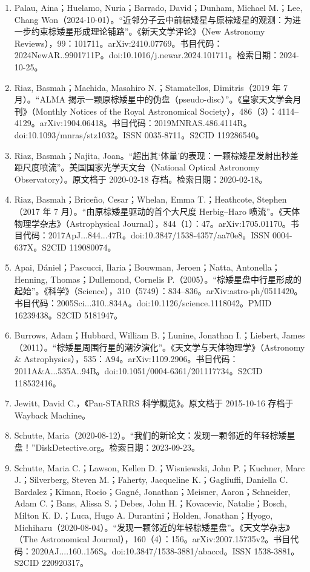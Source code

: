 \begin{enumerate}
\item Palau, Aina；Huelamo, Nuria；Barrado, David；Dunham, Michael M.；Lee, Chang Won（2024-10-01）。“近邻分子云中前棕矮星与原棕矮星的观测：为进一步约束棕矮星形成理论铺路”。《新天文学评论》（New Astronomy Reviews），99：101711。arXiv:2410.07769。书目代码：2024NewAR..9901711P。doi:10.1016/j.newar.2024.101711。检索日期：2024-10-25。
\item Riaz, Basmah；Machida, Masahiro N.；Stamatellos, Dimitris（2019 年 7 月）。“ALMA 揭示一颗原棕矮星中的伪盘（pseudo-disc）”。《皇家天文学会月刊》（Monthly Notices of the Royal Astronomical Society），486（3）：4114–4129。arXiv:1904.06418。书目代码：2019MNRAS.486.4114R。doi:10.1093/mnras/stz1032。ISSN 0035-8711。S2CID 119286540。
\item Riaz, Basmah；Najita, Joan。“超出其‘体量’的表现：一颗棕矮星发射出秒差距尺度喷流”。美国国家光学天文台（National Optical Astronomy Observatory）。原文档于 2020-02-18 存档。检索日期：2020-02-18。
\item Riaz, Basmah；Briceño, Cesar；Whelan, Emma T.；Heathcote, Stephen（2017 年 7 月）。“由原棕矮星驱动的首个大尺度 Herbig–Haro 喷流”。《天体物理学杂志》（Astrophysical Journal），844（1）：47。arXiv:1705.01170。书目代码：2017ApJ...844...47R。doi:10.3847/1538-4357/aa70e8。ISSN 0004-637X。S2CID 119080074。
\item Apai, Dániel；Pascucci, Ilaria；Bouwman, Jeroen；Natta, Antonella；Henning, Thomas；Dullemond, Cornelis P.（2005）。“棕矮星盘中行星形成的起始”。《科学》（Science），310（5749）：834–836。arXiv:astro-ph/0511420。书目代码：2005Sci...310..834A。doi:10.1126/science.1118042。PMID 16239438。S2CID 5181947。
\item Burrows, Adam；Hubbard, William B.；Lunine, Jonathan I.；Liebert, James（2011）。“棕矮星周围行星的潮汐演化”。《天文学与天体物理学》（Astronomy & Astrophysics），535：A94。arXiv:1109.2906。书目代码：2011A&A...535A..94B。doi:10.1051/0004-6361/201117734。S2CID 118532416。
\item Jewitt, David C.，《Pan-STARRS 科学概览》。原文档于 2015-10-16 存档于 Wayback Machine。
\item Schutte, Maria（2020-08-12）。“我们的新论文：发现一颗邻近的年轻棕矮星盘！”DiskDetective.org。检索日期：2023-09-23。
\item Schutte, Maria C.；Lawson, Kellen D.；Wisniewski, John P.；Kuchner, Marc J.；Silverberg, Steven M.；Faherty, Jacqueline K.；Gagliuffi, Daniella C. Bardalez；Kiman, Rocio；Gagné, Jonathan；Meisner, Aaron；Schneider, Adam C.；Bans, Alissa S.；Debes, John H.；Kovacevic, Natalie；Bosch, Milton K. D.；Luca, Hugo A. Durantini；Holden, Jonathan；Hyogo, Michiharu（2020-08-04）。“发现一颗邻近的年轻棕矮星盘”。《天文学杂志》（The Astronomical Journal），160（4）：156。arXiv:2007.15735v2。书目代码：2020AJ....160..156S。doi:10.3847/1538-3881/abaccd。ISSN 1538-3881。S2CID 220920317。

\end{enumerate}
